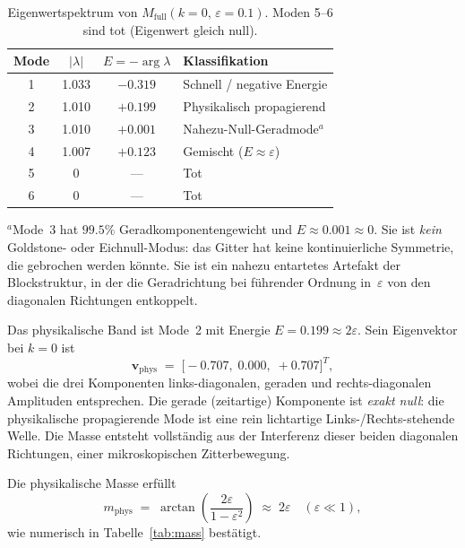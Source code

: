 \documentclass[twocolumn,showpacs,preprintnumbers,amsmath,amssymb]{revtex4-2}
\newcommand{\eps}{\varepsilon}
\newcommand{\mphys}{m_{\mathrm{phys}}}
\begin{document}
\begin{table}[t]
\caption{Eigenwertspektrum von $M_{\mathrm{full}}(k{=}0,\,\eps{=}0.1)$.
Moden 5–6 sind tot (Eigenwert gleich null).}
\label{tab:spectrum}
\begin{ruledtabular}
\begin{tabular}{cccl}
Mode & $|\lambda|$ & $E = -\arg\lambda$ & Klassifikation \\
\hline
1 & 1.033 & $-0.319$ & Schnell / negative Energie \\
2 & 1.010 & $+0.199$ & Physikalisch propagierend   \\
3 & 1.010 & $+0.001$ & Nahezu-Null-Geradmode$^a$ \\
4 & 1.007 & $+0.123$ & Gemischt ($E \approx \eps$) \\
5 & 0     & ---      & Tot                        \\
6 & 0     & ---      & Tot                        \\
\end{tabular}
\end{ruledtabular}
\noindent\small$^a$Mode~3 hat $99.5\%$ Geradkomponentengewicht und
$E \approx 0.001 \approx 0$. Sie ist \emph{kein} Goldstone- oder
Eichnull-Modus: das Gitter hat keine kontinuierliche Symmetrie, die gebrochen
werden könnte.  Sie ist ein nahezu entartetes Artefakt der Blockstruktur, in
der die Geradrichtung bei führender Ordnung in~$\eps$ von den diagonalen
Richtungen entkoppelt.
\end{table}

Das physikalische Band ist Mode~2 mit Energie $E = 0.199 \approx 2\eps$.
Sein Eigenvektor bei $k = 0$ ist
\begin{equation}
  \mathbf{v}_{\mathrm{phys}} \;=\;
  \bigl[-0.707,\; 0.000,\; +0.707\bigr]^T,
  \label{eq:phys_eigvec}
\end{equation}
wobei die drei Komponenten links-diagonalen, geraden und rechts-diagonalen
Amplituden entsprechen.
Die gerade (zeitartige) Komponente ist \emph{exakt null}: die physikalische
propagierende Mode ist eine rein lichtartige Links-/Rechts-stehende Welle.
Die Masse entsteht vollständig aus der Interferenz dieser beiden diagonalen
Richtungen, einer mikroskopischen Zitterbewegung.

Die physikalische Masse erfüllt
\begin{equation}
  \mphys \;=\; \arctan\!\left(\frac{2\eps}{1 - \eps^2}\right)
            \;\approx\; 2\eps \quad (\eps \ll 1),
  \label{eq:mass_formula}
\end{equation}
wie numerisch in Tabelle~\ref{tab:mass} bestätigt.
\end{document}
